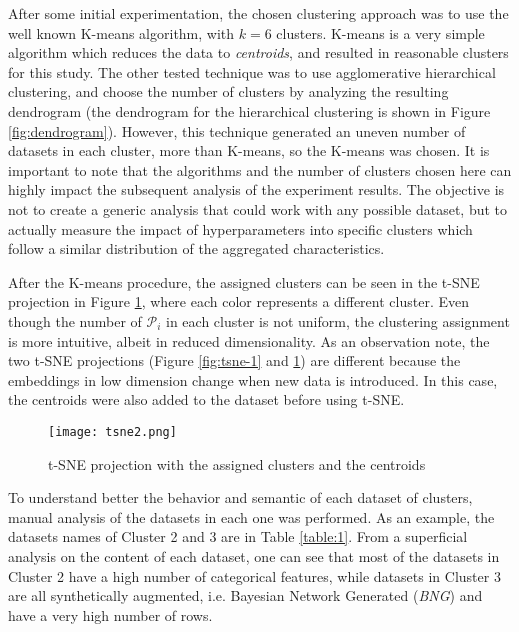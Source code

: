 After some initial experimentation, the chosen clustering approach was to use the well known K-means algorithm, with $k=6$ clusters. K-means is a very simple algorithm which reduces the data to \textit{centroids}, and resulted in reasonable clusters for this study. The other tested technique was to use agglomerative hierarchical clustering, and choose the number of clusters by analyzing the resulting dendrogram (the dendrogram for the hierarchical clustering is shown in Figure \ref{fig:dendrogram}). However, this technique generated an uneven number of datasets in each cluster, more than K-means, so the K-means was chosen. It is important to note that the algorithms and the number of clusters chosen here can highly impact the subsequent analysis of the experiment results. The objective is not to create a generic analysis that could work with any possible dataset, but to actually measure the impact of hyperparameters into specific clusters which follow a similar distribution of the aggregated characteristics.

After the K-means procedure, the assigned clusters can be seen in the t-SNE projection in Figure \ref{fig:tsne-2}, where each color represents a different cluster. Even though the number of $\mathcal{P}_i$ in each cluster is not uniform, the clustering assignment is more intuitive, albeit in reduced dimensionality. As an observation note, the two t-SNE projections (Figure \ref{fig:tsne-1} and  \ref{fig:tsne-2}) are different because the embeddings in low dimension change when new data is introduced. In this case, the centroids were also added to the dataset before using t-SNE.

\begin{figure}[!h]
    \centering
    \texttt{[image: tsne2.png]}
    \caption{t-SNE projection with the assigned clusters and the centroids}
    \label{fig:tsne-2}
\end{figure}

To understand better the behavior and semantic of each dataset of clusters, manual analysis of the datasets in each one was performed. As an example, the datasets names of Cluster 2 and 3 are in Table \ref{table:1}. From a superficial analysis on the content of each dataset, one can see that most of the datasets in Cluster 2 have a high number of categorical features, while datasets in Cluster 3 are all synthetically augmented, i.e. Bayesian Network Generated (\textit{BNG}) and have a very high number of rows.

